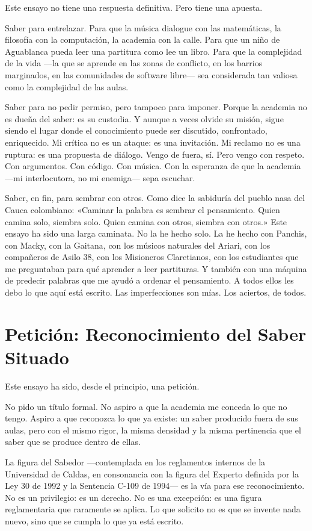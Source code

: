 \documentclass[14pt, a4paper]{article}
\begin{document}
Este ensayo no tiene una respuesta definitiva. Pero tiene una apuesta.

Saber para entrelazar. Para que la música dialogue con las
matemáticas, la filosofía con la computación, la academia con la
calle. Para que un niño de Aguablanca pueda leer una partitura como
lee un libro. Para que la complejidad de la vida —la que se aprende en
las zonas de conflicto, en los barrios marginados, en las comunidades
de software libre— sea considerada tan valiosa como la complejidad de
las aulas.

Saber para no pedir permiso, pero tampoco para imponer. Porque la
academia no es dueña del saber: es su custodia. Y aunque a veces
olvide su misión, sigue siendo el lugar donde el conocimiento puede
ser discutido, confrontado, enriquecido. Mi crítica no es un ataque:
es una invitación. Mi reclamo no es una ruptura: es una propuesta de
diálogo. Vengo de fuera, sí. Pero vengo con respeto. Con argumentos.
Con código. Con música. Con la esperanza de que la academia —mi
interlocutora, no mi enemiga— sepa escuchar.

Saber, en fin, para sembrar con otros. Como dice la sabiduría del
pueblo nasa del Cauca colombiano: «Caminar la palabra es sembrar el
pensamiento. Quien camina solo, siembra solo. Quien camina con otros,
siembra con otros.» Este ensayo ha sido una larga caminata. No la he
hecho solo. La he hecho con Panchis, con Macky, con la Gaitana, con
los músicos naturales del Ariari, con los compañeros de Asilo 38, con
los Misioneros Claretianos, con los estudiantes que me preguntaban
para qué aprender a leer partituras. Y también con una máquina de
predecir palabras que me ayudó a ordenar el pensamiento. A todos ellos
les debo lo que aquí está escrito. Las imperfecciones son mías. Los
aciertos, de todos.
\section{Petición: Reconocimiento del Saber Situado}
\label{peticion}
Este ensayo ha sido, desde el principio, una petición.

No pido un título formal. No aspiro a que la academia me conceda lo
que no tengo. Aspiro a que reconozca lo que ya existe: un saber
producido fuera de sus aulas, pero con el mismo rigor, la misma
densidad y la misma pertinencia que el saber que se produce dentro de
ellas.

La figura del Sabedor —contemplada en los reglamentos internos de la
Universidad de Caldas, en consonancia con la figura del Experto
definida por la Ley 30 de 1992 y la Sentencia C-109 de 1994— es la
vía para ese reconocimiento. No es un privilegio: es un derecho. No es
una excepción: es una figura reglamentaria que raramente se aplica. Lo
que solicito no es que se invente nada nuevo, sino que se cumpla lo
que ya está escrito.
\end{document}

